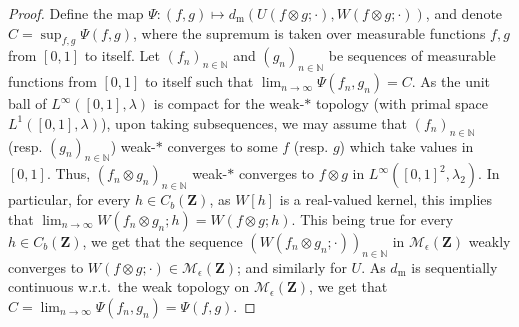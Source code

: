 \documentclass{amsart}
\newcommand{\wrt}{w.r.t.\ }
\theoremstyle{plain}
\theoremstyle{definition}
\newcommand{\Space}{\mathbf{Z}}
\newcommand{\MeasEps}{\mathcal{M}_{\epsilon}(\Space)}
\newcommand{\CbFunct}{C_b(\Space)}
\newcommand{\m}{\mathrm{m}}
\newcommand{\dmeas}{d_\m}
\newcommand{\N}{\mathbb{N}}
\begin{document}
\begin{proof}
Define the map $\Psi : (f,g) \mapsto \dmeas(U(f \otimes g;\cdot),W(f \otimes g;\cdot))$,
	and denote $C = \sup_{f,g} \Psi(f,g)$,
	where the supremum is taken over measurable functions $f,g$ from $[0,1]$ to itself.
Let $(f_n)_{n\in\N}$ and $(g_n)_{n\in\N}$ be sequences of measurable functions from $[0,1]$ to itself
	such that $\lim_{n\to\infty} \Psi(f_n, g_n)  = C$.
As the unit ball of $L^\infty([0,1],\lambda)$
	is compact for the weak-$*$ topology (with primal space $L^1([0,1],\lambda)$),
	upon taking subsequences, we may assume that $(f_n)_{n\in\N}$ (resp. $(g_n)_{n\in\N}$)
	weak-$*$ converges to some $f$ (resp. $g$) which take values in $[0,1]$.
Thus, $(f_n \otimes g_n)_{n\in\N}$ weak-$*$ converges to $f \otimes g$ in $L^\infty([0,1]^2,\lambda_2)$.
In particular, for every $h\in\CbFunct$, as $W[h]$ is a real-valued kernel, 
	this implies that $\lim_{n\to\infty} W(f_n \otimes g_n; h) = W(f \otimes g ; h)$.
This being true for every $h\in\CbFunct$, we get that the sequence
	$( W(f_n \otimes g_n;\cdot) )_{n\in\N}$ in $\MeasEps$ weakly converges 
	to $W(f \otimes g;\cdot)\in\MeasEps$; and similarly for $U$.
As $\dmeas$ is sequentially continuous \wrt the weak topology on $\MeasEps$,
	we get that $C = \lim_{n\to\infty} \Psi(f_n, g_n)
		= \Psi(f,g)$.


\end{proof}
\end{document}
